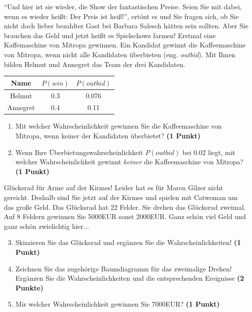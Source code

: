 \documentclass[a4paper, 9pt]{scrartcl}\usepackage[]{graphicx}\usepackage[]{xcolor}
\begin{document}
"`Und hier ist sie wieder, die Show der fantastischen Preise. Seien Sie mit
dabei, wenn es wieder hei{\ss}t: Der Preis ist hei{\ss}!"', ert{\"o}nt es und Sie
fragen sich, ob Sie nicht doch lieber bezahlter Gast bei Barbara Salesch
h{\"a}tten sein sollten. Aber Sie brauchen das Geld und jetzt hei{\ss}t es
Spielschows farmen! Erstmal eine Kaffemaschine von Mitropa
gewinnen. Ein Kandidat gewinnt die Kaffeemaschine von Mitropa, wenn nicht alle
Kandidaten {\"u}berbieten (eng. \textit{outbid}). Mit Ihnen bilden
Helmut und Annegret das Team der drei Kandidaten.

\begin{center}
\begin{tabular}{ccc}
  \toprule
  Name & $P(win)$ & $P(outbid)$\\
  \midrule
  Helmut & 0.3 & 0.076\\
  Annegret & 0.4 & 0.11 \\
  \bottomrule
\end{tabular}
\end{center}

\begin{enumerate}
\item Mit welcher Wahrscheinlichkeit gewinnen Sie die Kaffeemaschine von
  Mitropa, wenn keiner der Kandidaten {\"u}berbietet? \textbf{(1 Punkt)}
\item Wenn Ihre {\"U}berbietungswahrscheinlichkeit $P(outbid)$ bei
  0.02 liegt, mit welcher Wahrscheinlichkeit gewinnt
  \textit{keiner} die Kaffeemaschine von Mitropa? \textbf{(1 Punkt)}
\end{enumerate}

Gl{\"u}cksrad f{\"u}r Arme auf der Kirmes! Leider hat es f{\"u}r Maren Gilzer nicht
gereicht. Deshalb sind Sie jetzt auf der Kirmes und spielen mit
Catwoman um das gro{\ss}e Geld. Das Gl{\"u}cksrad hat 22
Felder. Sie drehen das Gl{\"u}cksrad zweimal. Auf 8 Feldern
gewinnen Sie 5000EUR sonst 2000EUR. Ganz sch{\"o}n viel Geld
und ganz sch{\"o}n zwielichtig hier...

\begin{enumerate}
  \setcounter{enumi}{2}  
\item Skizzieren Sie das Gl{\"u}cksrad und erg{\"a}nzen Sie die
  Wahrscheinlichkeiten! \textbf{(1 Punkt)}
\item Zeichnen Sie das zugeh{\"o}rige Baumdiagramm f{\"u}r das zweimalige Drehen!
  Erg{\"a}nzen Sie die Wahrscheinlichkeiten und die entsprechenden Ereignisse
  \textbf{(2 Punkte)}
\item Mir welcher Wahrscheinlichkeit gewinnen Sie 7000EUR? \textbf{(1
    Punkt)}
\end{enumerate}
\end{document}
